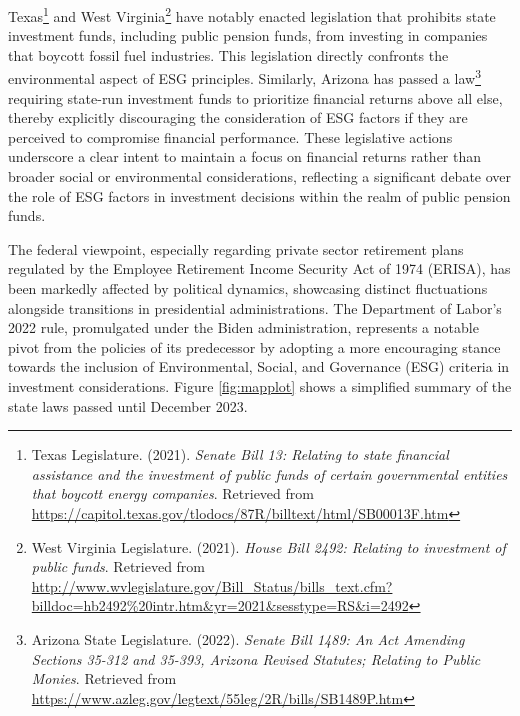 \documentclass[
  12pt,
]{article}
\begin{document}
Texas\footnote{Texas Legislature. (2021). \emph{Senate Bill 13: Relating to state financial assistance and the investment of public funds of certain governmental entities that boycott energy companies}. Retrieved from \url{https://capitol.texas.gov/tlodocs/87R/billtext/html/SB00013F.htm}} and West Virginia\footnote{West Virginia Legislature. (2021). \emph{House Bill 2492: Relating to investment of public funds}. Retrieved from \url{http://www.wvlegislature.gov/Bill_Status/bills_text.cfm?billdoc=hb2492\%20intr.htm\&yr=2021\&sesstype=RS\&i=2492}} have notably enacted legislation that prohibits state investment funds, including public pension funds, from investing in companies that boycott fossil fuel industries. This legislation directly confronts the environmental aspect of ESG principles. Similarly, Arizona has passed a law\footnote{Arizona State Legislature. (2022). \emph{Senate Bill 1489: An Act Amending Sections 35-312 and 35-393, Arizona Revised Statutes; Relating to Public Monies}. Retrieved from \url{https://www.azleg.gov/legtext/55leg/2R/bills/SB1489P.htm}} requiring state-run investment funds to prioritize financial returns above all else, thereby explicitly discouraging the consideration of ESG factors if they are perceived to compromise financial performance. These legislative actions underscore a clear intent to maintain a focus on financial returns rather than broader social or environmental considerations, reflecting a significant debate over the role of ESG factors in investment decisions within the realm of public pension funds.

The federal viewpoint, especially regarding private sector retirement plans regulated by the Employee Retirement Income Security Act of 1974 (ERISA), has been markedly affected by political dynamics, showcasing distinct fluctuations alongside transitions in presidential
administrations. The Department of Labor's 2022 rule, promulgated under the Biden administration, represents a notable pivot from the policies of its predecessor by adopting a more encouraging stance towards the inclusion of Environmental, Social, and Governance (ESG) criteria in investment considerations. Figure \ref{fig:mapplot} shows a simplified summary of the state laws passed until December 2023.
\end{document}
